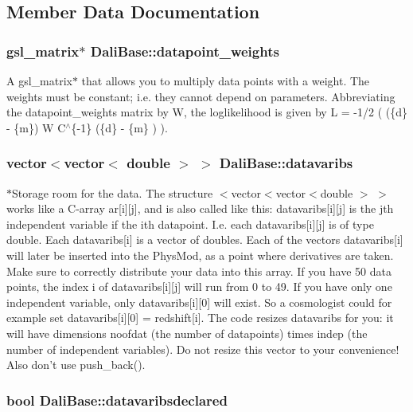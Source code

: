 \subsection{Member Data Documentation}
\hypertarget{classDaliBase_ac287ff97afe28a93bda558357beaee0d}{
\subsubsection[{datapoint\-\_\-weights}]{\setlength{\rightskip}{0pt plus 5cm}gsl\-\_\-matrix$\ast$ Dali\-Base\-::datapoint\-\_\-weights}}\label{classDaliBase_ac287ff97afe28a93bda558357beaee0d}
A gsl\-\_\-matrix$\ast$ that allows you to multiply data points with a weight. The weights must be constant; i.\-e. they cannot depend on parameters. Abbreviating the datapoint\-\_\-weights matrix by W, the loglikelihood is given by L = -\/1/2 ( (\{d\} -\/ \{m\}) W C$^\wedge$\{-\/1\} (\{d\} -\/ \{m\} ) ). \hypertarget{classDaliBase_abe548366dfd28590f8db1f681bb1b77d}{
\subsubsection[{datavaribs}]{\setlength{\rightskip}{0pt plus 5cm}vector$<$vector$<$ double $>$ $>$ Dali\-Base\-::datavaribs}}\label{classDaliBase_abe548366dfd28590f8db1f681bb1b77d}
$\ast$\-Storage room for the data. The structure $<$vector$<$vector$<$double $>$ $>$ works like a C-\/array ar\mbox{[}i\mbox{]}\mbox{[}j\mbox{]}, and is also called like this\-: datavaribs\mbox{[}i\mbox{]}\mbox{[}j\mbox{]} is the jth independent variable if the ith datapoint. I.\-e. each datavaribs\mbox{[}i\mbox{]}\mbox{[}j\mbox{]} is of type double. Each datavaribs\mbox{[}i\mbox{]} is a vector of doubles. Each of the vectors datavaribs\mbox{[}i\mbox{]} will later be inserted into the Phys\-Mod, as a point where derivatives are taken. Make sure to correctly distribute your data into this array. If you have 50 data points, the index i of datavaribs\mbox{[}i\mbox{]}\mbox{[}j\mbox{]} will run from 0 to 49. If you have only one independent variable, only datavaribs\mbox{[}i\mbox{]}\mbox{[}0\mbox{]} will exist. So a cosmologist could for example set datavaribs\mbox{[}i\mbox{]}\mbox{[}0\mbox{]} = redshift\mbox{[}i\mbox{]}. The code resizes datavaribs for you\-: it will have dimensions noofdat (the number of datapoints) times indep (the number of independent variables). Do not resize this vector to your convenience! Also don't use push\-\_\-back(). \hypertarget{classDaliBase_ac19be40e90cba3bdf8fc6a132b3d955d}{
\subsubsection[{datavaribsdeclared}]{\setlength{\rightskip}{0pt plus 5cm}bool Dali\-Base\-::datavaribsdeclared}}\label{classDaliBase_ac19be40e90cba3bdf8fc6a132b3d955d}
